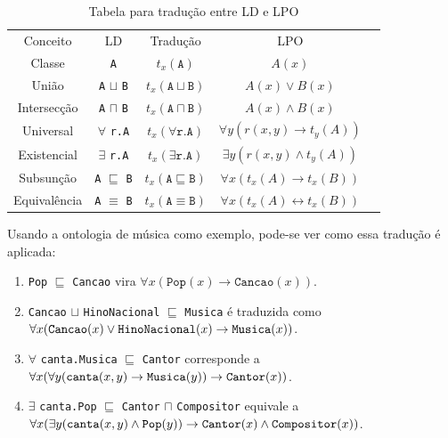 \begin{table}[H]
	\centering
	\begin{tabular}{|c|c|c|c|l}
		\cline{1-4}
		Conceito     & LD                                    & Tradução                                 & LPO                                              &  \\ \cline{1-4}
		Classe       & \texttt{A}                            & $t_x(\texttt{A})$                        & $A(x)$                                           &  \\ \cline{1-4}
		União        & \texttt{A} $ \sqcup $ \texttt{B}      & $t_x(\texttt{A} \sqcup \texttt{B})$      & $A(x) \lor B(x)$                                 &  \\ \cline{1-4}
		Intersecção  & \texttt{A} $ \sqcap $ \texttt{B}      & $t_x(\texttt{A} \sqcap \texttt{B})$      & $A(x) \land B(x)$                                &  \\ \cline{1-4}
		Universal    & $\forall$ \texttt{r.A}                & $t_x(\forall \texttt{r.A})$              & $\forall y(r(x,y) \to t_y(A))$                   &  \\ \cline{1-4}
		Existencial  & $\exists$ \texttt{r.A}                & $t_x(\exists \texttt{r.A})$              & $\exists y(r(x,y) \land t_y(A))$                 &  \\ \cline{1-4}
		Subsunção    & \texttt{A} $ \sqsubseteq $ \texttt{B} & $t_x(\texttt{A} \sqsubseteq \texttt{B})$ & $\forall x(t_x(A) \to t_x(B))$                   &  \\ \cline{1-4}
		Equivalência & \texttt{A} $ \equiv $ \texttt{B}      & $t_x(\texttt{A} \equiv \texttt{B})$      & $\forall x(t_x(A) \longleftrightarrow t_x(B))$   &  \\ \cline{1-4}
	\end{tabular}
	\caption{Tabela para tradução entre LD e LPO}
\end{table}

Usando a ontologia de música como exemplo, pode-se ver como essa tradução é aplicada:

\begin{enumerate}
	\item \texttt{Pop} $ \sqsubseteq $ \texttt{Cancao} vira $\forall x(\texttt{Pop}(x) \to \texttt{Cancao}(x))$.
	\item \texttt{Cancao} $ \sqcup $ \texttt{HinoNacional} $ \sqsubseteq $ \texttt{Musica} é traduzida como $\forall x(\texttt{Cancao}(x) \lor \texttt{HinoNacional}(x) \\ \to \texttt{Musica}(x))$.
	\item $ \forall $ \texttt{canta.Musica} $ \sqsubseteq $ \texttt{Cantor} corresponde a $ \forall x(\forall y(\texttt{canta}(x,y) \to \texttt{Musica}(y)) \to \\ \texttt{Cantor}(x)) $.
	\item $ \exists $ \texttt{canta.Pop} $ \sqsubseteq $ \texttt{Cantor} $ \sqcap $ \texttt{Compositor} equivale a $ \forall x (\exists y(\texttt{canta}(x,y) \land \texttt{Pop}(y)) \to \\ \texttt{Cantor}(x) \land \texttt{Compositor}(x))$.
\end{enumerate}


